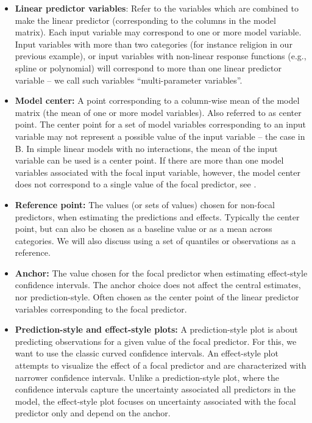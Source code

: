 \begin{itemize}
\item \textbf{Linear predictor variables}: Refer to the variables which are combined to make the linear predictor (corresponding to the columns in the model matrix). Each input variable may correspond to one or more model variable. Input variables with more than two categories (for instance religion in our previous example), or input variables with non-linear response functions (e.g., spline or polynomial) will correspond to more than one linear predictor variable -- we call such variables “multi-parameter variables”.

\item \textbf{Model center:} A point corresponding to a column-wise mean of the model matrix (the mean of one or more model variables). Also referred to as center point. The center point for a set of model variables corresponding to an input variable may not represent a possible value of the input variable -- the case in B. In simple linear models with no interactions, the mean of the input variable can be used is a center point. If there are more than one model variables associated with the focal input variable, however, the model center does not correspond to a single value of the focal predictor, see .


\item \textbf{Reference point:} The values (or sets of values) chosen for non-focal predictors, when estimating the predictions and effects. Typically the center point, but can also be chosen as a baseline value or as a mean across categories. We will also discuss using a set of quantiles or observations as a reference.

\item \textbf{Anchor:} The value chosen for the focal predictor when estimating effect-style confidence intervals. The anchor choice does not affect the central estimates, nor prediction-style. Often chosen as the center point of the linear predictor variables corresponding to the focal predictor. 

\item \textbf{Prediction-style and effect-style plots:} A prediction-style plot is about predicting observations for a given value of the focal predictor. For this, we want to use the classic curved confidence intervals. An effect-style plot attempts to visualize the effect of a focal predictor and are characterized with narrower confidence intervals. Unlike a prediction-style plot, where the confidence intervals capture the uncertainty associated all predictors in the model, the effect-style plot focuses on uncertainty associated with the focal predictor only and depend on the anchor.

\end{itemize}

